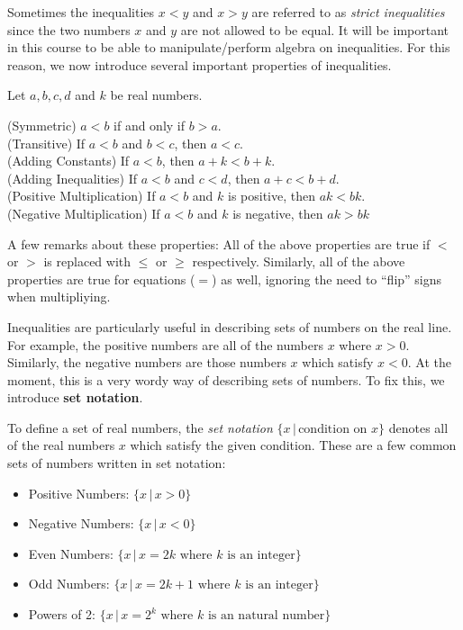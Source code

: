 \documentclass{article}
\newcommand{\tb}[1]{\textbf{#1}}
\newenvironment{mybox}[3]{
    \begin{center}
    \begin{tcolorbox}[width=#2\textwidth, colback={#3}, colbacktitle={#3}, title={\tb{#1}}, coltitle={black}, colframe={#3}, arc=1pt, breakable]}
    {\end{tcolorbox} 
    \end{center}}
\begin{document}
Sometimes the inequalities $x<y$ and $x>y$ are referred to as \emph{strict inequalities} since the two numbers $x$ and $y$ are not allowed to be equal. It will be important in this course to be able to manipulate/perform algebra on inequalities. For this reason, we now introduce several important properties of inequalities.

\begin{mybox}{Properties of Inequalities}{0.8}{babyblue}
    \doublespacing
    Let $a,b,c,d$ and $k$ be real numbers.

    \indent \quad (Symmetric) $a<b$ if and only if $b>a$. \\ 
    \indent \quad (Transitive) If $a<b$ and $b<c$, then $a<c$. \\ 
    \indent \quad (Adding Constants) If $a<b$, then $a+k<b+k$. \\
    \indent \quad (Adding Inequalities) If $a<b$ and $c<d$, then $a+c<b+d$. \\
    \indent \quad (Positive Multiplication) If $a<b$ and $k$ is positive, then $ak < bk$. \\
    \indent \quad (Negative Multiplication) If $a<b$ and $k$ is negative, then $ak > bk$
\end{mybox}

A few remarks about these properties: All of the above properties are true if $<$ or $>$ is replaced with $\leq$ or $\geq$ respectively. Similarly, all of the above properties are true for equations ($=$) as well, ignoring the need to ``flip'' signs when multipliying.

\vspace{5pt}
Inequalities are particularly useful in describing sets of numbers on the real line. For example, the positive numbers are all of the numbers $x$ where $x>0$. Similarly, the negative numbers are those numbers $x$ which satisfy $x<0$. At the moment, this is a very wordy way of describing sets of numbers. To fix this, we introduce \tb{set notation}.

\begin{mybox}{Set Notation}{0.9}{babyblue}
    To define a set of real numbers, the \emph{set notation} $\{x \,|\, \textrm{condition on }x \}$ denotes all of the real numbers $x$ which satisfy the given condition. These are a few common sets of numbers written in set notation:

    \vspace{5pt}
    \begin{itemize}
        \setlength\itemsep{0em}
        \item Positive Numbers: $\{x \,|\, x>0\}$
        \item Negative Numbers: $\{x \,|\, x<0\}$
        \item Even Numbers: $\{x \,|\, x=2k \textrm{ where } k \textrm{ is an integer}\}$
        \item Odd Numbers: $\{x \,|\, x=2k + 1 \textrm{ where } k \textrm{ is an integer}\}$
        \item Powers of 2: $\{x \,|\, x=2^k \textrm{ where } k \textrm{ is an natural number}\}$
    \end{itemize}
\end{mybox}
\end{document}
